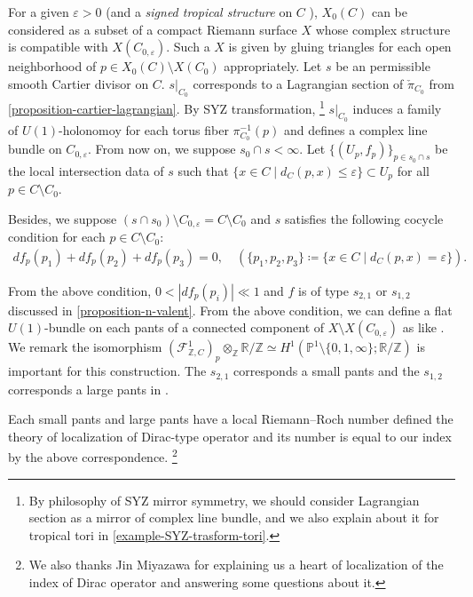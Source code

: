 \documentclass[a4paper,dvipdfmx,reqno,12pt]{amsart}
\theoremstyle{definition}
\newcommand{\deq}{\coloneqq}
\newcommand{\vep}{\varepsilon}%
\newcommand{\myfootnote}[1]{\hspace{-5pt}\footnote{#1}}
\numberwithin{equation}{section}
\begin{document}
For a given $\vep>0$ (and a \emph{signed tropical structure}
on $C$ \cite{MR3076066}), 
$X_0(C)$ can be considered as a subset of a compact 
Riemann surface $X$ whose complex structure is 
compatible with $X(C_{0,\vep})$. 
Such a $X$ is given by gluing triangles for 
each open neighborhood of $p\in X_0(C)\setminus X(C_0)$
appropriately.
Let $s$ be an permissible smooth Cartier divisor on $C$.
$s|_{C_0}$ corresponds to a Lagrangian section of 
$\check{\pi}_{C_0}$ from 
\cref{proposition-cartier-lagrangian}.
By SYZ transformation,
\myfootnote{By philosophy of SYZ mirror symmetry,
we should consider Lagrangian section 
as a mirror of complex line bundle,
and we also explain about it for tropical tori in 
\cref{example-SYZ-trasform-tori}.
}
$s|_ {C_0}$ induces a family of $U(1)$-holonomoy for
each torus fiber $\pi_{C_0}^{-1}(p)$ and defines a 
complex line bundle on $C_{0,\vep}$. From now on, 
we suppose $s_0\cap s<\infty$. 
Let $\{(U_p, f_p)\}_{p\in s_0\cap s}$ be the local intersection data 
of $s$ such that 
$\{x\in C\mid d_C(p,x)\leq \vep\}\subset U_p$ for
all $p\in C\setminus C_0$.

Besides, we suppose 
$(s\cap s_0)\setminus C_{0,\vep}=C\setminus C_0$ and $s$ satisfies the following cocycle
condition for each $p\in C\setminus C_0$:
\begin{align}
df_p(p_1)+df_p(p_2)+df_p(p_3)=0,\quad 
(\{p_1,p_2,p_3\}\deq \{x\in C\mid d_C(p,x)=\vep\}).
\end{align}

From the above condition, $0<|df_p(p_i)| \ll 1$ and
$f$ is of type $s_{2,1}$ or $s_{1,2}$ discussed
in \cref{proposition-n-valent}.
From the above condition, we can define 
a flat $U(1)$-bundle on each pants of a 
connected component of $X\setminus X(C_{0,\vep})$
as like \cite[6.1.3]{MR2676658}.
We remark the isomorphism
$(\mathcal{F}_{\mathbb{Z},C}^{1})_p\otimes_{\mathbb{Z}}
\mathbb{R}/\mathbb{Z}\simeq 
H^1(\mathbb{P}^{1}\setminus 
\{0,1,\infty\};\mathbb{R}/\mathbb{Z})$
is important for this construction.
The $s_{2,1}$
corresponds a small pants and the $s_{1,2}$
corresponds a large pants in 
\cite[Definition 6.3]{MR2676658}.


Each small pants and large pants have a local 
Riemann--Roch number defined the theory of 
localization of Dirac-type operator and its 
number is equal 
to our index by the above correspondence.
\myfootnote{
We also thanks Jin Miyazawa
for explaining us a heart of localization of 
the index of Dirac operator and answering some 
questions about it.}
\end{document}

